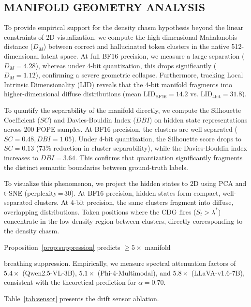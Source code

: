 \documentclass{ieeetmlcn}
\begin{document}
\subsection{MANIFOLD GEOMETRY ANALYSIS}
\label{sec:manifold}



To provide empirical support for the density chasm hypothesis beyond the linear constraints of 2D visualization, we compute the high-dimensional Mahalanobis distance ($D_M$) between correct and hallucinated token clusters in the native 512-dimensional latent space. At full BF16 precision, we measure a large separation ($D_M = 4.28$), whereas under 4-bit quantization, this drops significantly ($D_M = 1.12$), confirming a severe geometric collapse. Furthermore, tracking Local Intrinsic Dimensionality (LID) reveals that the 4-bit manifold fragments into higher-dimensional diffuse distributions (mean $\text{LID}_{\text{BF16}} = 14.2$ vs. $\text{LID}_{\text{4bit}} = 31.8$).

To quantify the separability of the manifold directly, we compute the Silhouette Coefficient ($SC$) and Davies-Bouldin Index ($DBI$) on hidden state representations across 200 POPE samples. At BF16 precision, the clusters are well-separated ($SC = 0.48, DBI = 1.05$). Under 4-bit quantization, the Silhouette score drops to $SC = 0.13$ ($73\%$ reduction in cluster separability), while the Davies-Bouldin index increases to $DBI = 3.64$. This confirms that quantization significantly fragments the distinct semantic boundaries between ground-truth labels. 

To visualize this phenomenon, we project the hidden states to 2D using PCA and t-SNE (perplexity\,=\,30). At BF16 precision, hidden states form compact, well-separated clusters. At 4-bit precision, the same clusters fragment into diffuse, overlapping distributions. Token positions where the CDG fires ($S_t > \lambda^*$) concentrate in the low-density region between clusters, directly corresponding to the density chasm.


Proposition~\ref{prop:suppression} predicts $\geq 5\times$ manifold

breathing suppression. Empirically, we measure spectral attenuation
factors of $5.4\times$ (Qwen2.5-VL-3B), $5.1\times$
(Phi-4-Multimodal), and $5.8\times$ (LLaVA-v1.6-7B), consistent with
the theoretical prediction for $\alpha=0.70$.

Table~\ref{tab:sensor} presents the drift sensor ablation.
\end{document}
